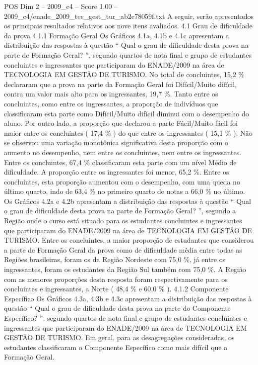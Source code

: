 \begin{textsample}{POS Dim 2 – 2009\_c4 – Score 1.00 – 2009\_c4/enade\_2009\_tec\_gest\_tur\_ab2c78059f.txt}
A seguir, serão apresentados os principais resultados relativos aos nove itens avaliados. 4.1 Grau de dificuldade da prova 4.1.1 Formação Geral Os Gráficos 4.1a, 4.1b e 4.1c apresentam a distribuição das respostas à questão “ Qual o grau de dificuldade desta prova na parte de Formação Geral? ”, segundo quartos de nota final e grupo de estudantes concluintes e ingressantes que participaram do ENADE/2009 na área de TECNOLOGIA EM GESTÃO DE TURISMO.
No total de concluintes, 15,2 \% declararam que a prova na parte da Formação Geral foi Difícil/Muito difícil, contra um valor mais alto para os ingressantes, 19,7 \%.
Tanto entre os concluintes, como entre os ingressantes, a proporção de indivíduos que classificaram esta parte como Difícil/Muito difícil diminui com o desempenho do aluno.
Por outro lado, a proporção que declarou a parte Fácil/Muito fácil foi maior entre os concluintes ( 17,4 \% ) do que entre os ingressantes ( 15,1 \% ).
Não se observou uma variação monotônica significativa desta proporção com o aumento no desempenho, nem entre os concluintes, nem entre os ingressantes.
Entre os concluintes, 67,4 \% classificaram esta parte com um nível Médio de dificuldade.
A proporção entre os ingressantes foi menor, 65,2 \%.
Entre os concluintes, esta proporção aumentou com o desempenho, com uma queda no último quarto, indo de 63,4 \% no primeiro quarto de notas a 66,0 \% no último.
Os Gráficos 4.2a e 4.2b apresentam a distribuição das respostas à questão “ Qual o grau de dificuldade desta prova na parte de Formação Geral? ”, segundo a Região onde o curso está situado para os estudantes concluintes e ingressantes que participaram do ENADE/2009 na área de TECNOLOGIA EM GESTÃO DE TURISMO.
Entre os concluintes, a maior proporção de estudantes que considerou a parte de Formação Geral da prova como de dificuldade média entre todas as Regiões brasileiras, foram os da Região Nordeste com 75,0 \%, já entre os ingressantes, foram os estudantes da Região Sul também com 75,0 \%.
A Região com as menores proporções desta resposta foram respectivamente para os concluintes e ingressantes, a Norte ( 48,4 \% e 60,0 \% ). 4.1.2 Componente Específico Os Gráficos 4.3a, 4.3b e 4.3c apresentam a distribuição das respostas à questão “ Qual o grau de dificuldade desta prova na parte do Componente Específico? ”, segundo quartos de nota final e grupo de estudantes concluintes e ingressantes que participaram do ENADE/2009 na área de TECNOLOGIA EM GESTÃO DE TURISMO.
Em geral, para as desagregações consideradas, os estudantes classificaram o Componente Específico como mais difícil que a Formação Geral.

\end{textsample}
